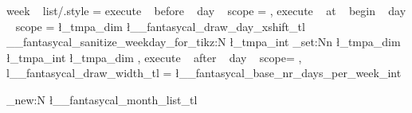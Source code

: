 \tikzset
  {
    week ~ list/.style = 
      {
        execute ~ before ~ day ~ scope =
          {
              {
                  { 
                    \pgftransformyshift{-\pgf@y}
                  } 
              }
          }
        ,
        execute ~ at ~ begin ~ day ~ scope =
          {
            \pgfmathsetlength \l_tmpa_dim { \l__fantasycal_draw_day_xshift_tl}
            \__fantasycal_sanitize_weekday_for_tikz:N \l_tmpa_int
            \dim_set:Nn \l_tmpa_dim { \l_tmpa_int \l_tmpa_dim }
          }
        ,
        execute ~ after ~ day ~ scope=
          {
              {
              }
          }
        ,
        l__fantasycal_draw_width_tl = \l__fantasycal_base_nr_days_per_week_int
      }    
  }
    
    
    

%

\tl_new:N \l__fantasycal_month_list_tl

